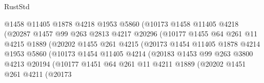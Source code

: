 \begin{lexlean}{RustStd}
\begin{coremodule}
{\begin{coremodule}
{{{{{{{{{{{{{{{{{{{{{{{{{{{{{                              @1458
                              @11405
                              @1878
                              @4218
                              @1953
                              @5860
                              (@10173
                                @1458
                                @11405
                                @4218
                                (@20287
                                  @1457
                                  @99
                                  @263
                                  @2813
                                  @4217
                                  @20296
                                  (@10177
                                    @1455
                                    @64
                                    @261
                                    @11
                                    @4215
                                    @1889
                                    (@20202
                                      @1455
                                      @261
                                      @4215
                                      (@20173
                                        @1454
                                        @11405
                                        @1878
                                        @4214
                                        @1953
                                        @5860
                                        (@10173
                                          @1454
                                          @11405
                                          @4214
                                          (@20183
                                            @1453
                                            @99
                                            @263
                                            @3800
                                            @4213
                                            @20194
                                            (@10177
                                              @1451
                                              @64
                                              @261
                                              @11
                                              @4211
                                              @1889
                                              (@20202
                                                @1451
                                                @261
                                                @4211
                                                (@20173
}}}}}}}}}}}}}}}}}}}}}}}}}}}}}
\end{coremodule}}
\end{coremodule}
\end{lexlean}
